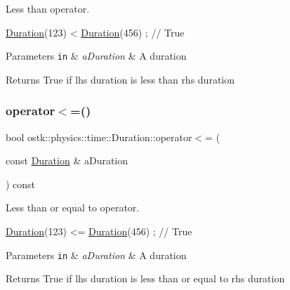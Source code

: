 Less than operator. 


\begin{DoxyCode}
\hyperlink{classostk_1_1physics_1_1time_1_1_duration_a6ba3a020742ca6e3bf0b1970dd039c07}{Duration}(123) < \hyperlink{classostk_1_1physics_1_1time_1_1_duration_a6ba3a020742ca6e3bf0b1970dd039c07}{Duration}(456) ; \textcolor{comment}{// True}
\end{DoxyCode}



\begin{DoxyParams}[1]{Parameters}
\mbox{\tt in}  & {\em a\+Duration} & A duration \\
\hline
\end{DoxyParams}
\begin{DoxyReturn}{Returns}
True if lhs duration is less than rhs duration 
\end{DoxyReturn}
\mbox{\label{classostk_1_1physics_1_1time_1_1_duration_a31b9328d64a66fd3f46ca8100b8dd91c}} 
\subsubsection{\texorpdfstring{operator$<$=()}{operator<=()}}
{\footnotesize\ttfamily bool ostk\+::physics\+::time\+::\+Duration\+::operator$<$= (\begin{DoxyParamCaption}\item[{const \hyperlink{classostk_1_1physics_1_1time_1_1_duration}{Duration} \&}]{a\+Duration }\end{DoxyParamCaption}) const}



Less than or equal to operator. 


\begin{DoxyCode}
\hyperlink{classostk_1_1physics_1_1time_1_1_duration_a6ba3a020742ca6e3bf0b1970dd039c07}{Duration}(123) <= \hyperlink{classostk_1_1physics_1_1time_1_1_duration_a6ba3a020742ca6e3bf0b1970dd039c07}{Duration}(456) ; \textcolor{comment}{// True}
\end{DoxyCode}



\begin{DoxyParams}[1]{Parameters}
\mbox{\tt in}  & {\em a\+Duration} & A duration \\
\hline
\end{DoxyParams}
\begin{DoxyReturn}{Returns}
True if lhs duration is less than or equal to rhs duration 
\end{DoxyReturn}
\mbox{\label{classostk_1_1physics_1_1time_1_1_duration_a92649b4f3f332daf372bb78ac1db6740}} 
